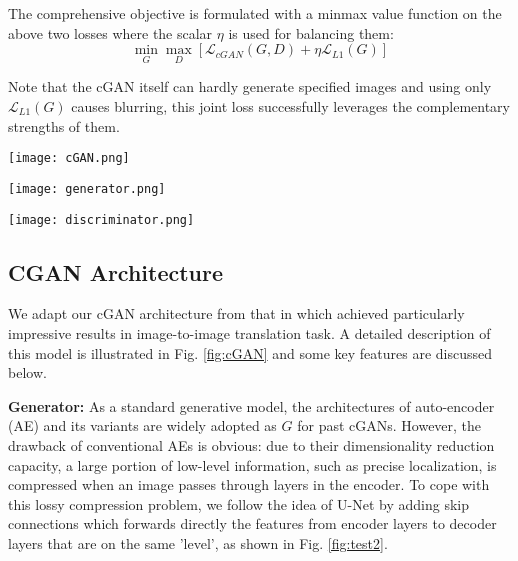 \documentclass{bmvc2k}
\begin{document}
The comprehensive objective is formulated with a minmax value function on the above two losses where the scalar $\eta$ is used for balancing them:
\begin{equation}\label{final_loss}
\min_G \max_D [\mathcal{L}_{cGAN}(G,D) + \eta\mathcal{L}_{L1}(G)]
\end{equation}

Note that the cGAN itself can hardly generate specified images and using only $\mathcal{L}_{L1}(G)$ causes blurring, this joint loss successfully leverages the complementary strengths of them. 

\begin{figure*}
\begin{minipage}[c][7.2cm][t]{.3\textwidth}
  \vspace*{0.6cm}
  \hspace*{0.1cm}
  \centering
  \texttt{[image: cGAN.png]}
  \label{fig:test1}
\end{minipage}%
\begin{minipage}[c][7.2cm][t]{.7\textwidth}
  \centering
  \texttt{[image: generator.png]}
  \label{fig:test2}\par%
  \texttt{[image: discriminator.png]}
  \label{fig:test3}
\end{minipage}
\caption{The mechanism and architecture of cGAN. In Fig. \ref{fig:test2}, the noise variable $z$ presents itself under the the form of dropout layers, while the black arrows portray the skip connections. All convolution and deconvolution layers are with filter size 4$\times$4 and 1-padding, $n$ and $s$ represent the number of output channels and stride value, respectively. (Best view in color)}
\label{fig:cGAN}
\end{figure*}

\subsection{CGAN Architecture}
We adapt our cGAN architecture from that in \cite{isola2016image} which achieved particularly impressive results in image-to-image translation task. A detailed description of this model is illustrated in Fig. \ref{fig:cGAN} and some key features are discussed below.

\textbf{Generator:} As a standard generative model, the architectures of auto-encoder (AE) \cite{hinton2006reducing} and its variants \cite{vincent2010stacked, rifai2011contractive, kingma2013auto} are widely adopted as $G$ for past cGANs. However, the drawback of conventional AEs is obvious: due to their dimensionality reduction capacity, a large portion of low-level information, such as precise localization, is compressed when an image passes through layers in the encoder. To cope with this lossy compression problem, we follow the idea of U-Net \cite{ronneberger2015u} by adding skip connections which forwards directly the features from encoder layers to decoder layers that are on the same 'level', as shown in Fig. \ref{fig:test2}.
\end{document}
